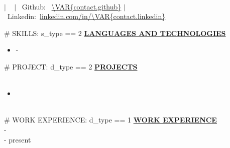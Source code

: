 \documentclass{article}
\begin{document}
\begin{center}
\thispagestyle{empty}
\Large \textbf{ } \\
\normalsize 
    $\mid$ ~
    $\mid$ ~Github:~ \url{\VAR{contact.github}}
    $\mid$ ~Linkedin:~\url{linkedin.com/in/\VAR{contact.linkedin}}
~\\\hrulefill
\end{center}
\#{ SKILLS: s_type == 2 } 
\noindent \textbf{\underline{LANGUAGES AND TECHNOLOGIES}} 
\begin{itemize}[noitemsep,nolistsep,leftmargin=*]
    \item \textbf{} - 
\end{itemize}
\#{ PROJECT: d_type == 2 }              
\noindent \textbf{\underline{PROJECTS}} \\
\noindent \textbf{} \hfill {}\\
\textit{} %
\begin{itemize}[noitemsep,nolistsep,leftmargin=*]
    \item {} 
\end{itemize}
        ~\\
\#{ WORK EXPERIENCE: d_type == 1 }
\noindent \textbf{\underline{WORK EXPERIENCE}} \\
\noindent \textbf{} \hfill {} - \\
    \noindent \textbf{} \hfill {} - present\\
\textit{} \hfill \textit{} %
\end{document}
